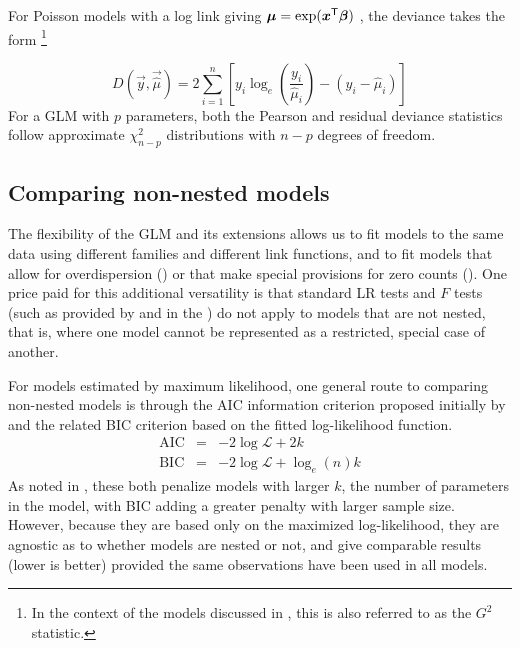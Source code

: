 \documentclass[11pt]{book}\usepackage[]{graphicx}\usepackage[]{color}
\begin{document}
For Poisson models with a log link giving $\bm{\mu} = \exp(\bm{x}^\mathsf{T} \bm{\beta})$ , the deviance takes the form%
\footnote{In the context of the \loglin models discussed in , this is also referred to
as the \LR $G^2$ statistic.}

\begin{equation}\label{eq:pois-deviance}
D (\vec{y}, \vec{\widehat{\mu}}) = 
  2 \sum_{i=1}^n \left[ y_i \log_e \left( \frac{y_i}{\widehat{\mu}_i} \right) - (y_i - \widehat{\mu}_i) \right]
\end{equation}
For a GLM with $p$ parameters, both the Pearson and residual deviance statistics follow
approximate $\chi^2_{n-p}$ distributions with $n-p$ degrees of freedom.

% 

\subsection{Comparing non-nested models}\label{sec:glm-nonnest}

The flexibility of the GLM and its extensions allows us to fit models 
to the same data using different families and different link functions, and to
fit models that allow for overdispersion ()
or that make special provisions for zero counts ().
One price paid for this additional versatility is that standard
LR tests and $F$ tests (such as provided by 
and  in the )
do not apply to models that are not nested, that is, where one
model cannot be represented as a restricted, special case of another.

For models estimated by maximum likelihood, one general route to comparing
non-nested models is through the AIC information criterion proposed initially
by \citet{Akaike:73} and the related BIC criterion \citep{Schwartz:78}
based on the fitted log-likelihood function. 
\begin{eqnarray}
\textrm{AIC} & = & -2 \log \mathcal{L} + 2 k \\
\textrm{BIC} & = & -2 \log \mathcal{L} + \log_e(n) k
\end{eqnarray}
As noted in , these both penalize models with larger $k$,
the number of parameters in the model, with BIC adding a greater penalty with
larger sample size.
However, because they are based only on the 
maximized log-likelihood, they are agnostic as to whether models are nested or not,
and give comparable results (lower is better) provided the same observations have
been used in all models.
\end{document}
